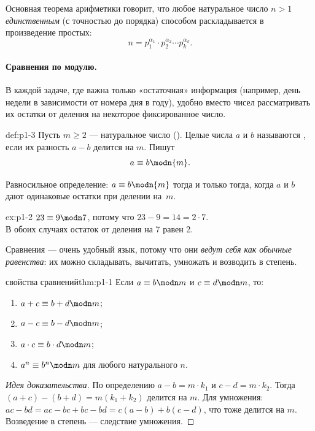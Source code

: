 Основная теорема арифметики говорит, что любое натуральное число $n > 1$ \emph{единственным} (с точностью до порядка) способом раскладывается в произведение простых:
\[
n = p_1^{\alpha_1} \cdot p_2^{\alpha_2} \cdots p_k^{\alpha_k}.
\]

\paragraph*{Сравнения по модулю.} В каждой задаче, где важна только «остаточная» информация (например, день недели в зависимости от номера дня в году), удобно вместо чисел рассматривать их остатки от деления на некоторое фиксированное число.

\begin{definition}{}{def:p1-3}
Пусть $m \ge 2$ --- натуральное число (). Целые числа $a$ и $b$ называются , если их разность $a - b$ делится на $m$. Пишут
\[
a \equiv b \modn{m}.
\]
\end{definition}

\noindent
Равносильное определение: $a \equiv b \modn{m}$ тогда и только тогда, когда $a$ и $b$ дают одинаковые остатки при делении на~$m$.

\begin{example}{}{ex:p1-2}
$23 \equiv 9 \modn 7$, потому что $23 - 9 = 14 = 2\cdot 7$.\\ В обоих случаях остаток от деления на 7 равен 2.
\end{example}

Сравнения --- очень удобный язык, потому что они \emph{ведут себя как обычные равенства}: их можно складывать, вычитать, умножать и возводить в степень.

\begin{theorem}{свойства сравнений}{thm:p1-1}
Если $a \equiv b \modn m$ и $c \equiv d \modn m$, то:
\begin{enumerate}
  \item $a + c \equiv b + d \modn m$;
  \item $a - c \equiv b - d \modn m$;
  \item $a \cdot c \equiv b \cdot d \modn m$;
  \item $a^n \equiv b^n \modn m$ для любого натурального $n$.
\end{enumerate}
\end{theorem}

\begin{proof}[Идея доказательства]
По определению $a - b = m\cdot k_1$ и $c - d = m\cdot k_2$. Тогда $(a + c) - (b + d) = m(k_1 + k_2)$ делится на $m$. Для умножения: $ac - bd = ac - bc + bc - bd = c(a-b) + b(c-d)$, что тоже делится на $m$. Возведение в степень --- следствие умножения. \qedhere
\end{proof}

